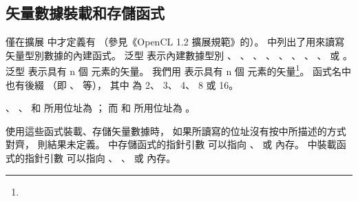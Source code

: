 \subsection[sec:vectorLsFunc]{矢量數據裝載和存儲函式}

\startbuffer
僅在擴展  中才定義有 %
（參見《OpenCL 1.2 擴展規範》的{}）。
\stopbuffer
{}中列出了用來讀寫矢量型別數據的內建函式。
泛型  表示內建數據型別
 、 、 、 、
 、 、 、 、
  或 。
泛型  表示具有 n 個  元素的矢量。
我們用  表示具有 n 個  元素的矢量\footnote{\getbuffer}。
函式名中也有後綴  （即 、  等），
其中  為 2、 3、 4、 8 或 16。

\startnotepar
{}、 、  和 
所用位址為 ；
而  和 
所用位址為 。
\stopnotepar

{}

使用這些函式裝載、存儲矢量數據時，
如果所讀寫的位址沒有按中所描述的方式對齊，
則結果未定義。
中存儲函式的指針引數  可以指向
 、  或  內存。
中裝載函式的指針引數  可以指向
 、 、  或  內存。

